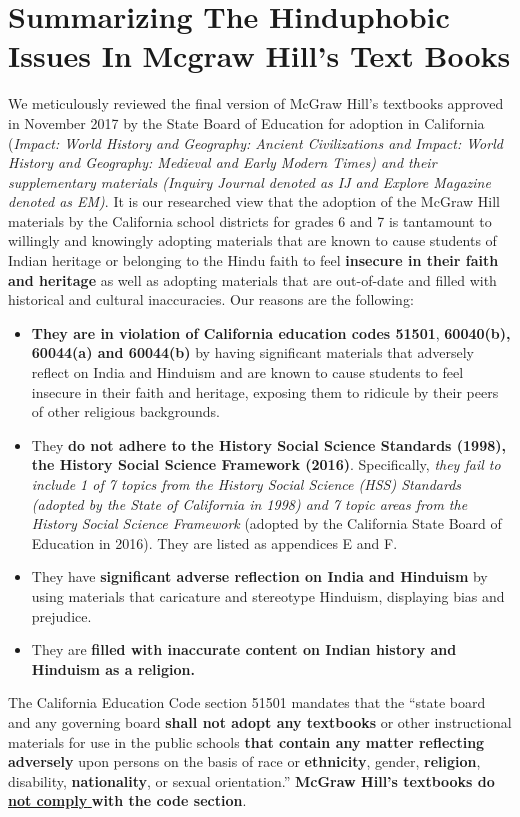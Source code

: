 \chapter{Summarizing The Hinduphobic Issues In Mcgraw Hill’s Text Books}

We meticulously reviewed the final version of McGraw Hill’s textbooks approved in November 2017 by the State Board of Education for adoption in California (\textit{Impact: World History and Geography: Ancient Civilizations and Impact: World History and Geography: Medieval and Early Modern Times) and their supplementary materials (Inquiry Journal denoted as IJ and Explore Magazine denoted as EM)}. It is our researched view that the adoption of the McGraw Hill materials by the California school districts for grades 6 and 7 is tantamount to willingly and knowingly adopting materials that are known to cause students of Indian heritage or belonging to the Hindu faith to feel \textbf{insecure in their faith and heritage} as well as adopting materials that are out-of-date and filled with historical and cultural inaccuracies. Our reasons are the following:

\begin{itemize} 
\item \textbf{They are in violation of California education codes 51501}, \textbf{60040(b), 60044(a) and 60044(b)} by having significant materials that adversely reflect on India and Hinduism and are known to cause students to feel insecure in their faith and heritage, exposing them to ridicule by their peers of other religious backgrounds. 
\item They \textbf{do not adhere to the History Social Science Standards (1998), the History Social Science Framework (2016)}. Specifically, \textit{they fail to include 1 of 7 topics from the History Social Science (HSS) Standards (adopted by the State of California in 1998) and 7 topic areas from the History Social Science Framework} (adopted by the California State Board of Education in 2016). They are listed as appendices E and F. 
\item They have \textbf{significant adverse reflection on India and Hinduism} by using materials that caricature and stereotype Hinduism, displaying bias and prejudice.
\item They are \textbf{filled with inaccurate content on Indian history and Hinduism as a religion.} 
\end{itemize}

The California Education Code section 51501 mandates that the “state board and any governing board \textbf{shall not adopt any textbooks} or other instructional materials for use in the public schools \textbf{that contain any matter reflecting adversely} upon persons on the basis of race or \textbf{ethnicity}, gender, \textbf{religion}, disability, \textbf{nationality}, or sexual orientation.” \textbf{McGraw Hill’s textbooks do} \underline{\textbf{not comply} } \textbf{with the code section}. 

